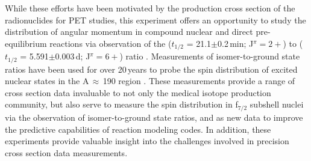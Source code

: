 


While these efforts have been motivated by the production cross section of the  radionuclides for PET studies, this experiment offers an opportunity to study the distribution of angular momentum in compound nuclear and direct pre-equilibrium reactions via observation of the  ($t_{1/2}$ = 21.1$\pm$0.2\,min; J$^\pi=2+$) to  ($t_{1/2}$ = 5.591$\pm$0.003\,d; J$^\pi=6+$)   ratio \cite{Dong2015,Wang2017}.
Measurements of isomer-to-ground state ratios have been used for over 20\,years to probe the spin distribution of excited nuclear states in the A\,$\approx$\,190 region \cite{PhysRevC.73.034613,PhysRevC.45.1171}.
These measurements provide a range of cross section data invaluable to not only the medical isotope production community, but  also serve to measure the spin distribution in f$_{7/2}$ subshell nuclei via the observation of isomer-to-ground state ratios, and  as new data to improve the predictive capabilities of  reaction modeling codes. 
In addition, these experiments provide valuable insight into the challenges  involved in precision cross section data measurements. 










